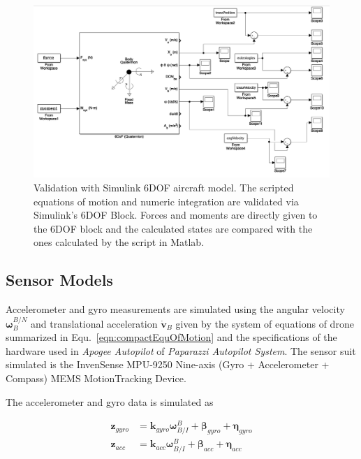 \begin{figure}
\center
\includegraphics[width=1.1\columnwidth]{figures/validationViaSimulink}
\caption{Validation with Simulink 6DOF aircraft model. The scripted equations of motion and numeric integration are validated via Simulink's 6DOF Block. Forces and moments are directly given to the 6DOF block and the calculated states are compared with the ones calculated by the script in Matlab.}
\label{figure:validationSimulink}
\end{figure}

\fi

\subsection{Sensor Models}

Accelerometer and gyro measurements are simulated using the angular velocity $\bm{\omega}^{B/N}_B$ and translational acceleration $\dot{\bm{v}}_B$ given by the system of equations of drone summarized in Equ.~\ref{eqn:compactEquOfMotion} and the specifications of the hardware used in \emph{Apogee Autopilot} of \emph{Paparazzi Autopilot System}.
The sensor suit simulated is the InvenSense MPU-9250 Nine-axis (Gyro + Accelerometer + Compass) MEMS MotionTracking Device.
 
The accelerometer and gyro data is simulated as 
 
 \begin{align}
\bm{z}_{gyro} &= \bm{k}_{gyro} \bm{\omega}_{B/I}^B + \bm{\beta}_{gyro} + \bm{\eta}_{gyro}\\
\bm{z}_{acc} &= \bm{k}_{acc} \bm{\omega}_{B/I}^B + \bm{\beta}_{acc} + \bm{\eta}_{acc}
\end{align}

